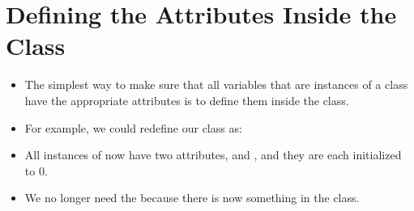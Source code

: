 \documentclass[letterpaper,10pt,english]{sphinxmanual}
\begin{document}
\section{Defining the Attributes Inside the Class}
\label{\detokenize{lecture_notes/lec18_classes1:defining-the-attributes-inside-the-class}}\begin{itemize}
\item {} 
The simplest way to make sure that all variables that are instances
of a class have the appropriate attributes is to define them inside
the class.

\item {} 
For example, we could redefine our class as:

\begin{sphinxVerbatim}[commandchars=\\\{\}]
 
      
      
\end{sphinxVerbatim}

\item {} 
All instances of  now have two attributes,  and
, and they are each initialized to 0.

\item {} 
We no longer need the  because there is now something in the
class.

\end{itemize}
\end{document}
